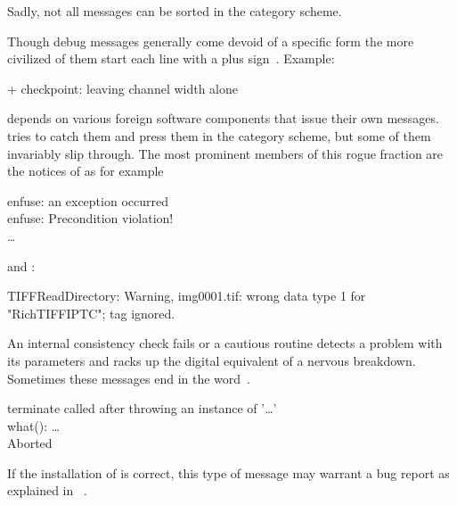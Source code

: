 \noindent Sadly, not all messages can be sorted in the category scheme.

\begin{description}
\item[Debug Messages:] Though debug messages generally come devoid of a specific form the more
  civilized of them start each line with a plus sign~\sample{+}.  Example:

  \begin{literal}
    + checkpoint: leaving channel width alone
  \end{literal}

\item[Foreign Sources:] \appcmd{} depends on various foreign software components that issue
  their own messages.  \App{} tries to catch them and press them in the category scheme, but
  some of them invariably slip through.  The most prominent members of this rogue fraction are
  the notices of  as for example

  \begin{literal}
    enfuse: an exception occurred \\
    enfuse: Precondition violation! \\
    \dots
  \end{literal}

  and :

  \begin{literal}
    TIFFReadDirectory: Warning, img0001.tif: wrong data type 1 for "RichTIFFIPTC"; tag ignored.
  \end{literal}

\item[``Should-Never-Happen'':] An internal consistency check fails or a cautious routine
  detects a problem with its parameters and racks up the digital equivalent of a nervous
  breakdown.  Sometimes these messages end in the word~.

  \begin{literal}
    terminate called after throwing an instance of '\dots' \\
    what(): \dots \\
    Aborted
  \end{literal}

  If the installation of \appcmd{} is correct, this type of message may warrant a bug report as
  explained in \appendixName~.
\end{description}

